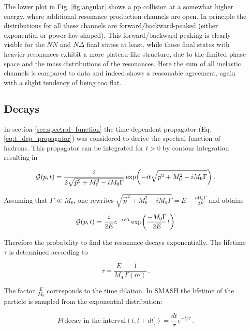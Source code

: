 The lower plot in Fig. \ref{fig:angular} shows a pp collision at a somewhat
higher energy, where additional resonance production channels are open. In
principle the distributions for all these channels are forward/backward-peaked
(either exponential or power-law shaped). This forward/backward peaking is
clearly visible for the $NN$ and $N\Delta$ final states at least, while those
final states with heavier resonances exhibit a more plateau-like structure, due
to the limited phase space and the mass distributions of the resonances. Here
the sum of all inelastic channels is compared to data and indeed shows a
reasonable agreement, again with a slight tendency of being too flat.



\subsection{Decays}

In section \ref{sec:spectral_function} the time-dependent propagator
(Eq. \ref{eq:t_dep_propagator}) was considered to derive the spectral
function of hadrons. This propagator can be integrated for $t > 0$
by contour integration resulting in

\begin{equation}
  \mathcal{G}(p,t) = \frac{i}{2\sqrt{\vec{p}^2 + M_0^2 - i M_0 \Gamma}}
                     \exp{\!\left({-i t \sqrt{\vec{p}^2 + M_0^2 - i M_0 \Gamma}}\right)} \,.
\end{equation}

Assuming that $\Gamma \ll M_0$, one rewrites $\sqrt{\vec{p}^2 + M_0^2 - i M_0
\Gamma} = E - \frac{i M_0 \Gamma}{2 E}$ and obtains

\begin{equation}
  \mathcal{G}(p,t) = \frac{i}{2 E} e^{-i E t} \exp{\!\left({\frac{- M_0 \Gamma}{2 E} t}\right)}
\end{equation}

Therefore the probability to find the resonance decays exponentially. The lifetime
$\tau$ is determined according to

\begin{equation}
  \tau = \frac{E}{M_0} \frac{1}{\Gamma(m)} \,.
\end{equation}

The factor $\frac{E}{M_0}$ corresponds to the time dilation. In SMASH the lifetime
of the particle is sampled from the exponential distribution:

\begin{equation}
  P(\text{decay in the interval}(t, t+dt]) = \frac{dt}{\tau} e^{-t/\tau} \,.
\end{equation}

